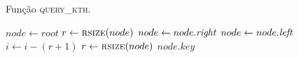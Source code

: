 \begin{algorithm}
    \caption[Algoritmo \textsc{query\_kth} da árvore binária de busca]{Função \textsc{query\_kth}.}
    \label{alg:abb:query}
    \begin{algorithmic}[1]
            \State $node \leftarrow root$
            \State $r \leftarrow \Call{rsize}{node}$
                    \State $node \leftarrow node.\textit{right}$
                \Else
                    \State $node \leftarrow node.\textit{left}$
                    \State $i \leftarrow i - (r + 1)$
                \EndIf
                \State $r \leftarrow \Call{rsize}{node}$
            \EndWhile
            \State \Return $node.key$
        \EndFunction
    \end{algorithmic}
\end{algorithm}